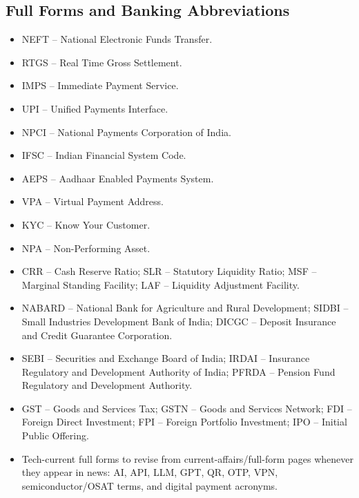 \documentclass[10pt,a4paper]{article}
\begin{document}
\subsection{Full Forms and Banking Abbreviations}
\begin{itemize}
    \item NEFT -- National Electronic Funds Transfer.
    \item RTGS -- Real Time Gross Settlement.
    \item IMPS -- Immediate Payment Service.
    \item UPI -- Unified Payments Interface.
    \item NPCI -- National Payments Corporation of India.
    \item IFSC -- Indian Financial System Code.
    \item AEPS -- Aadhaar Enabled Payments System.
    \item VPA -- Virtual Payment Address.
    \item KYC -- Know Your Customer.
    \item NPA -- Non-Performing Asset.
    \item CRR -- Cash Reserve Ratio; SLR -- Statutory Liquidity Ratio; MSF -- Marginal Standing Facility; LAF -- Liquidity Adjustment Facility.
    \item NABARD -- National Bank for Agriculture and Rural Development; SIDBI -- Small Industries Development Bank of India; DICGC -- Deposit Insurance and Credit Guarantee Corporation.
    \item SEBI -- Securities and Exchange Board of India; IRDAI -- Insurance Regulatory and Development Authority of India; PFRDA -- Pension Fund Regulatory and Development Authority.
    \item GST -- Goods and Services Tax; GSTN -- Goods and Services Network; FDI -- Foreign Direct Investment; FPI -- Foreign Portfolio Investment; IPO -- Initial Public Offering.
    \item Tech-current full forms to revise from current-affairs/full-form pages whenever they appear in news: AI, API, LLM, GPT, QR, OTP, VPN, semiconductor/OSAT terms, and digital payment acronyms.
\end{itemize}
\end{document}
